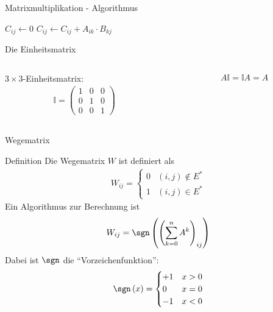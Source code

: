 \begin{frame}{Matrixmultiplikation - Algorithmus}
    \begin{algorithm}
        \begin{algorithmic}
                    \State $C_{ij}\gets 0$
                    \State $C_{ij}\gets C_{ij} + A_{ik}\cdot B_{kj}$
                    \EndFor
                \EndFor
            \EndFor
        \end{algorithmic}
    \end{algorithm}
\end{frame}
\begin{frame}{Die Einheitsmatrix}
    \begin{columns}
        \begin{column}{.5\textwidth}
            $3\times 3$-Einheitsmatrix:
            \begin{align*}
                \mathbb{I} = \begin{pmatrix}
                    1 & 0 & 0\\
                    0 & 1 & 0\\
                    0 & 0 & 1
                \end{pmatrix}
            \end{align*}
        \end{column}
        \begin{column}{.5\textwidth}
            \begin{align*}
                A\mathbb{I} = \mathbb{I}A = A
            \end{align*}
        \end{column}
    \end{columns}
\end{frame}
\begin{frame}{Wegematrix}
    \begin{block}{Definition}
        Die Wegematrix $W$ ist definiert als
        \begin{align*}
            W_{ij} = \begin{cases} 0 & \left( i,j \right) \notin E^*\\
                1 & \left( i,j \right) \in E^*\end{cases}
        \end{align*}
        Ein Algorithmus zur Berechnung ist
        \begin{align*}
            W_{ij} = \sgn\left( \left( \sum_{k=0}^{n}A^k \right)_{ij} \right)
        \end{align*}
        Dabei ist $\sgn$ die ``Vorzeichenfunktion'':
        \begin{align*}
            \sgn\left( x \right) = \begin{cases} + 1& x>0\\
                0 & x=0\\
                -1 & x<0\end{cases}
        \end{align*}
    \end{block}
\end{frame}
